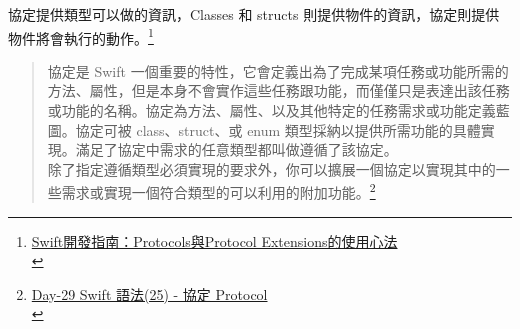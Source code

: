 \documentclass[a4paper,12pt]{article}
\begin{document}
協定提供類型可以做的資訊，Classes 和 structs 則提供物件的資訊，協定則提供物件將會執行的動作。\footnote{\href{https://www.appcoda.com.tw/swift-protocol/}{Swift開發指南：Protocols與Protocol Extensions的使用心法}\\}\\
\begin{verse}
協定是 Swift 一個重要的特性，它會定義出為了完成某項任務或功能所需的方法、屬性，但是本身不會實作這些任務跟功能，而僅僅只是表達出該任務或功能的名稱。協定為方法、屬性、以及其他特定的任務需求或功能定義藍圖。協定可被 class、struct、或 enum 類型採納以提供所需功能的具體實現。滿足了協定中需求的任意類型都叫做遵循了該協定。\\
\vspace*{1em}
除了指定遵循類型必須實現的要求外，你可以擴展一個協定以實現其中的一些需求或實現一個符合類型的可以利用的附加功能。\footnote{\href{https://ithelp.ithome.com.tw/articles/10197366}{Day-29 Swift 語法(25) - 協定 Protocol}\\}\\
\end{verse}
\end{document}
